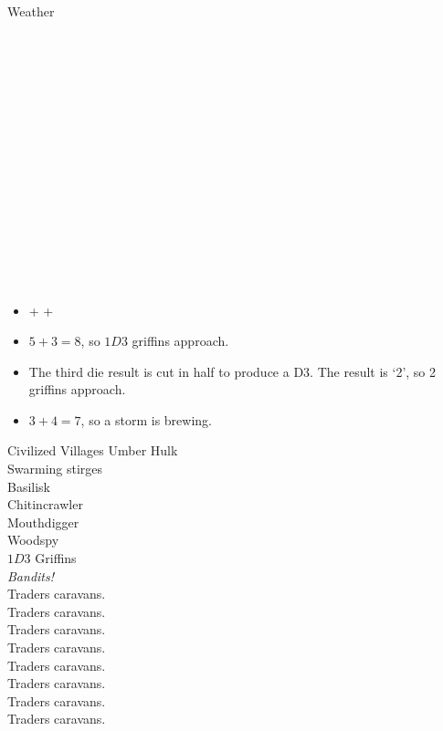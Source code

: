 \begin{multicols}{2}
\begin{encChart}{Weather}
  \encLine \bigWeatherList \\
  \encLine \bigWeatherList \\
  \encLine \bigWeatherList \\
  \encLine \bigWeatherList \\
  \encLine \bigWeatherList \\
  \encLine \bigWeatherList \\
  \encLine \bigWeatherList \\
  \encLine \bigWeatherList \\
  \encLine \bigWeatherList \\
  \encLine \bigWeatherList \\
  \encLine \bigWeatherList \\
  \encLine \bigWeatherList \\
  \encLine \bigWeatherList \\
  \encLine \bigWeatherList \\
  \encLine \bigWeatherList \\
  \encLine \bigWeatherList \\
\end{encChart}

\begin{itemize}
  \item
  {\Large{} +  + }
  \item
  $5 + 3 = 8$, so $1D3$ griffins approach.
  \item
  The third die result is cut in half to produce a D3.
  The result is `2', so 2 griffins approach.
  \item
  $3 + 4 = 7$, so a storm is brewing.
\end{itemize}

\clearpage

\begin{encChart}{Civilized Villages}
  \encLine Umber Hulk \\
  \encLine Swarming stirges \\
  \encLine Basilisk \\
  \encLine Chitincrawler \\
  \encLine Mouthdigger \\
  \encLine Woodspy \\
  \encLine $1D3$ Griffins \\
  \hline
  \encLine \textit{Bandits!} \\
  \hline
  \encLine {} Traders caravans. \\
  \encLine {} Traders caravans. \\
  \encLine {} Traders caravans. \\
  \encLine {} Traders caravans. \\
  \encLine {} Traders caravans. \\
  \encLine {} Traders caravans. \\
  \encLine {} Traders caravans. \\
  \encLine {} Traders caravans. \\
\end{encChart}


\end{multicols}
